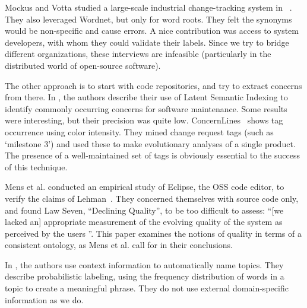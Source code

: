 \documentclass{acm_proc_article-sp}
\begin{document}
Mockus and Votta studied a large-scale industrial change-tracking system in ~\cite{Mockus00}. They also leveraged Wordnet, but only for word roots. They felt the synonyms would be non-specific and cause errors. A nice contribution was access to system developers, with whom they could validate their labels. Since we try to bridge different organizations, these interviews are infeasible (particularly in the distributed world of open-source software).

The other approach is to start with code repositories, and try to extract concerns from there. In \cite{marcus04wcre}, the authors describe their use of Latent Semantic Indexing to identify commonly occurring concerns for software maintenance. Some results were interesting, but their precision was quite low. ConcernLines~\cite{treude09cl} shows tag occurrence using color intensity. They mined change request tags (such as `milestone 3') and used these to make evolutionary analyses of a single product. The presence of a well-maintained set of tags is obviously essential to the success of this technique.


Mens et al. \cite{mens08icsm} conducted an empirical study of Eclipse, the OSS code editor, to verify the claims of Lehman~\cite{lehman97sms}. They concerned themselves with source code only, and found Law Seven, ``Declining Quality'', to be too difficult to assess: ``[we lacked an] appropriate measurement of the evolving quality of the system as perceived by the users \cite[p. 388]{mens08icsm}''. This paper examines the notions of quality in terms of a consistent ontology, as Mens et al. call for in their conclusions.

In \cite{Mei2007}, the authors use context information to automatically name topics. They describe probabilistic labeling, using the frequency distribution of words in a topic to create a meaningful phrase. They do not use external domain-specific information as we do.
\end{document}

